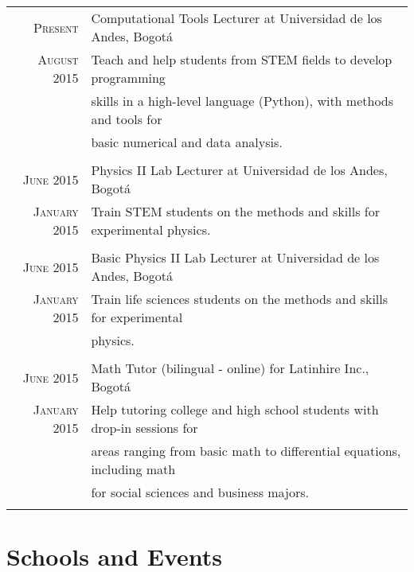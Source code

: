 \documentclass[a4paper,10pt]{article} %
\begin{document}
\begin{longtable}{rl}

\textsc{Present} & Computational Tools Lecturer at Universidad de los Andes, Bogot\'a  \\ 
\textsc{August 2015} & Teach and help students from STEM fields to develop programming  \\ & skills in a high-level language (Python), with methods and tools for  \\ & basic numerical and data analysis. \\
\\

\textsc{June 2015} & Physics II Lab Lecturer at Universidad de los Andes, Bogot\'a  \\ 
\textsc{January 2015} & Train STEM students on the methods and skills for experimental physics.\\
\\

\textsc{June 2015} & Basic Physics II Lab Lecturer at Universidad de los Andes, Bogot\'a \\ 
\textsc{January 2015} & Train life sciences students on the methods and skills for experimental  \\ & physics.\\
\\

\textsc{June 2015} & Math Tutor (bilingual - online) for Latinhire Inc., Bogot\'a\\ 
\textsc{January 2015} & Help tutoring college and high school students with drop-in sessions for \\ & areas ranging from basic math to differential equations, including math  \\ & for social sciences and business majors. \\
\\

\end{longtable}


\color{OrangeRed}
\section{Schools and Events}
\color{black}
\end{document}
